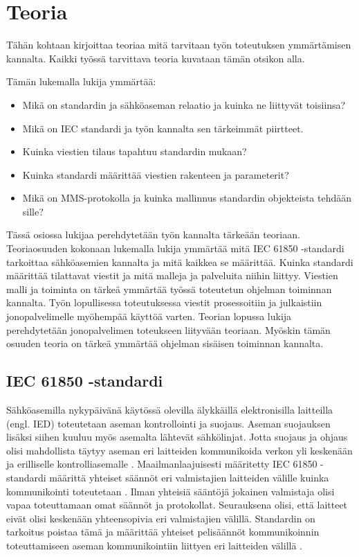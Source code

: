\chapter{Teoria}
\label{ch:teoria}
\begin{it}
	Tähän kohtaan kirjoittaa teoriaa mitä tarvitaan työn toteutuksen ymmärtämisen kannalta. Kaikki työssä tarvittava teoria kuvataan tämän otsikon alla.

	Tämän lukemalla lukija ymmärtää:
	\begin{itemize}
		\item Mikä on standardin ja sähköaseman relaatio ja kuinka ne liittyvät toisiinsa?
		\item Mikä on IEC standardi ja työn kannalta sen tärkeimmät piirtteet.
		\item Kuinka viestien tilaus tapahtuu standardin mukaan?
		\item Kuinka standardi määrittää viestien rakenteen ja parameterit?
		\item Mikä on MMS-protokolla ja kuinka mallinnus standardin objekteista tehdään sille?
	\end{itemize}
\end{it}

Tässä osiossa lukijaa perehdytetään työn kannalta tärkeään teoriaan. Teoriaosuuden kokonaan lukemalla lukija ymmärtää mitä IEC 61850 -standardi tarkoittaa sähköasemien kannalta ja mitä kaikkea se määrittää. Kuinka standardi määrittää tilattavat viestit ja mitä malleja ja palveluita niihin liittyy. Viestien malli ja toiminta on tärkeä ymmärtää työssä toteutetun ohjelman toiminnan kannalta. Työn lopullisessa toteutuksessa viestit prosessoitiin ja julkaistiin jonopalvelimelle myöhempää käyttöä varten. Teorian lopussa lukija perehdytetään jonopalvelimen toteukseen liityvään teoriaan. Myöskin tämän osuuden teoria on tärkeä ymmärtää ohjelman sisäisen toiminnan kannalta.

\section{IEC 61850 -standardi}

Sähköasemilla nykypäivänä käytössä olevilla älykkäillä elektronisilla laitteilla (engl. IED) toteutetaan aseman kontrollointi ja suojaus. Aseman suojauksen lisäksi siihen kuuluu myös asemalta lähtevät sähkölinjat. Jotta suojaus ja ohjaus olisi mahdollista täytyy aseman eri laitteiden kommunikoida verkon yli keskenään ja erilliselle kontrolliasemalle \cite[s.~1]{Brunner2008}. Maailmanlaajuisesti määritetty IEC 61850 -standardi määrittä yhteiset säännöt eri valmistajien laitteiden välille kuinka kommunikointi toteutetaan \cite[s.~10]{IEC61850-7-1}. Ilman yhteisiä sääntöjä jokainen valmistaja olisi vapaa toteuttamaan omat säännöt ja protokollat. Seurauksena olisi, että laitteet eivät olisi keskenään yhteensopivia eri valmistajien välillä. Standardin on tarkoitus poistaa tämä ja määrittää yhteiset pelisäännöt kommunikoinnin toteuttamiseen aseman kommunikointiin liittyen eri laitteiden välillä \cite[s.~1]{Kaneda2008}.

